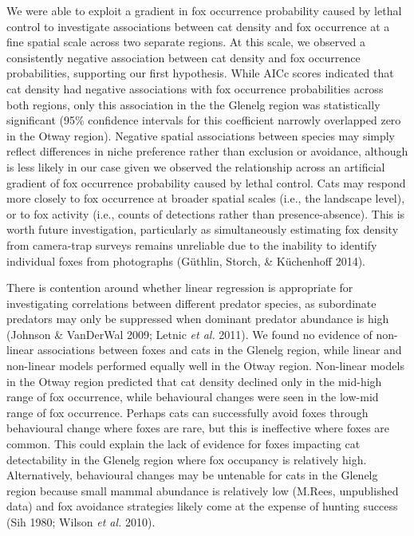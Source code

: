 \documentclass[11pt,a4paper,titlepage,twoside,openright]{style/unimelbthesis}
\begin{document}
\begin{mainmatter}
We were able to exploit a gradient in fox occurrence probability caused by lethal control to investigate associations between cat density and fox occurrence at a fine spatial scale across two separate regions. At this scale, we observed a consistently negative association between cat density and fox occurrence probabilities, supporting our first hypothesis. While AICc scores indicated that cat density had negative associations with fox occurrence probabilities across both regions, only this association in the the Glenelg region was statistically significant (95\% confidence intervals for this coefficient narrowly overlapped zero in the Otway region). Negative spatial associations between species may simply reflect differences in niche preference rather than exclusion or avoidance, although is less likely in our case given we observed the relationship across an artificial gradient of fox occurrence probability caused by lethal control. Cats may respond more closely to fox occurrence at broader spatial scales (i.e., the landscape level), or to fox activity (i.e., counts of detections rather than presence-absence). This is worth future investigation, particularly as simultaneously estimating fox density from camera-trap surveys remains unreliable due to the inability to identify individual foxes from photographs (Güthlin, Storch, \& Küchenhoff 2014).

There is contention around whether linear regression is appropriate for investigating correlations between different predator species, as subordinate predators may only be suppressed when dominant predator abundance is high (Johnson \& VanDerWal 2009; Letnic \emph{et al.} 2011). We found no evidence of non-linear associations between foxes and cats in the Glenelg region, while linear and non-linear models performed equally well in the Otway region. Non-linear models in the Otway region predicted that cat density declined only in the mid-high range of fox occurrence, while behavioural changes were seen in the low-mid range of fox occurrence. Perhaps cats can successfully avoid foxes through behavioural change where foxes are rare, but this is ineffective where foxes are common. This could explain the lack of evidence for foxes impacting cat detectability in the Glenelg region where fox occupancy is relatively high. Alternatively, behavioural changes may be untenable for cats in the Glenelg region because small mammal abundance is relatively low (M.Rees, unpublished data) and fox avoidance strategies likely come at the expense of hunting success (Sih 1980; Wilson \emph{et al.} 2010).


\end{mainmatter}
\end{document}
